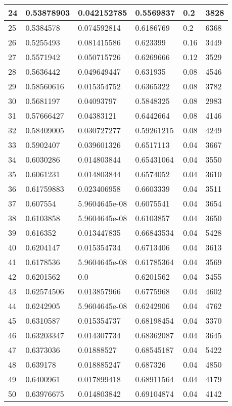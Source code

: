\begin{longtable}{|l|l|l|l|l|l|}
24 & 0.53878903 & 0.042152785 & 0.5569837 & 0.2 & 3828 \\ \hline 
25 & 0.5384578 & 0.074592814 & 0.6186769 & 0.2 & 6368 \\ \hline 
26 & 0.5255493 & 0.081415586 & 0.623399 & 0.16 & 3449 \\ \hline 
27 & 0.5571942 & 0.050715726 & 0.6269666 & 0.12 & 3529 \\ \hline 
28 & 0.5636442 & 0.049649447 & 0.631935 & 0.08 & 4546 \\ \hline 
29 & 0.58560616 & 0.015354752 & 0.6365322 & 0.08 & 3782 \\ \hline 
30 & 0.5681197 & 0.04093797 & 0.5848325 & 0.08 & 2983 \\ \hline 
31 & 0.57666427 & 0.04383121 & 0.6442664 & 0.08 & 4146 \\ \hline 
32 & 0.58409005 & 0.030727277 & 0.59261215 & 0.08 & 4249 \\ \hline 
33 & 0.5902407 & 0.039601326 & 0.6517113 & 0.04 & 3667 \\ \hline 
34 & 0.6030286 & 0.014803844 & 0.65431064 & 0.04 & 3550 \\ \hline 
35 & 0.6061231 & 0.014803844 & 0.6574052 & 0.04 & 3610 \\ \hline 
36 & 0.61759883 & 0.023406958 & 0.6603339 & 0.04 & 3511 \\ \hline 
37 & 0.607554 & 5.9604645e-08 & 0.6075541 & 0.04 & 3654 \\ \hline 
38 & 0.6103858 & 5.9604645e-08 & 0.6103857 & 0.04 & 3650 \\ \hline 
39 & 0.616352 & 0.013447835 & 0.66843534 & 0.04 & 5428 \\ \hline 
40 & 0.6204147 & 0.015354734 & 0.6713406 & 0.04 & 3613 \\ \hline 
41 & 0.6178536 & 5.9604645e-08 & 0.61785364 & 0.04 & 3569 \\ \hline 
42 & 0.6201562 & 0.0 & 0.6201562 & 0.04 & 3455 \\ \hline 
43 & 0.62574506 & 0.013857966 & 0.6775968 & 0.04 & 4602 \\ \hline 
44 & 0.6242905 & 5.9604645e-08 & 0.6242906 & 0.04 & 4762 \\ \hline 
45 & 0.6310587 & 0.015354737 & 0.68198454 & 0.04 & 3370 \\ \hline 
46 & 0.63203347 & 0.014307734 & 0.68362087 & 0.04 & 3645 \\ \hline 
47 & 0.6373036 & 0.01888527 & 0.68545187 & 0.04 & 5422 \\ \hline 
48 & 0.639178 & 0.018885247 & 0.687326 & 0.04 & 4850 \\ \hline 
49 & 0.6400961 & 0.017899418 & 0.68911564 & 0.04 & 4179 \\ \hline 
50 & 0.63976675 & 0.014803842 & 0.69104874 & 0.04 & 4142 \\ \hline 
\end{longtable}